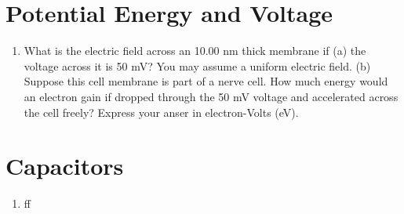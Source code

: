 \documentclass[10pt]{article}
\begin{document}
\section{Potential Energy and Voltage}

\begin{enumerate}
\item What is the electric field across an 10.00 nm thick membrane if (a) the voltage across it is 50 mV? You may assume a uniform electric field. (b) Suppose this cell membrane is part of a nerve cell.  How much energy would an electron gain if dropped through the 50 mV voltage and accelerated across the cell freely?  Express your anser in electron-Volts (eV). \\ \vspace{1.25cm}
\end{enumerate}

\section{Capacitors}

\begin{enumerate}
\item ff
\end{enumerate}
\end{document}

